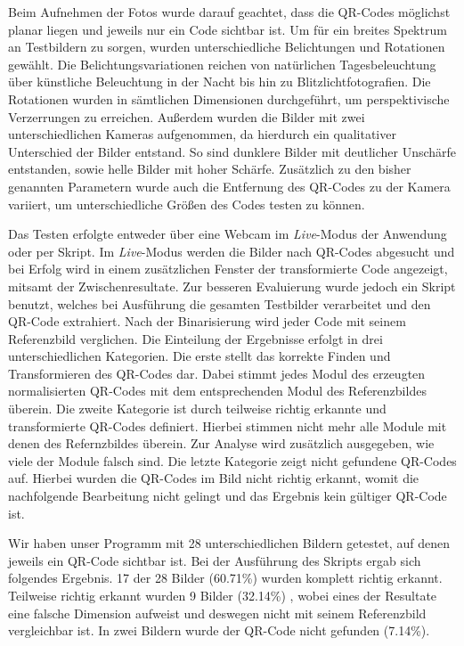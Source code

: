 \documentclass[a4paper, oneside, 12pt]{article}
\begin{document}
Beim Aufnehmen der Fotos wurde darauf geachtet, dass die QR-Codes möglichst planar liegen und jeweils nur ein Code sichtbar ist. Um für ein breites Spektrum an Testbildern zu sorgen, wurden unterschiedliche Belichtungen und Rotationen gewählt. Die Belichtungsvariationen reichen von natürlichen Tagesbeleuchtung über künstliche Beleuchtung in der Nacht bis hin zu Blitzlichtfotografien. Die Rotationen wurden in sämtlichen Dimensionen durchgeführt, um perspektivische Verzerrungen zu erreichen. Außerdem wurden die Bilder mit zwei unterschiedlichen Kameras aufgenommen, da hierdurch ein qualitativer Unterschied der Bilder entstand. So sind dunklere Bilder mit deutlicher Unschärfe entstanden, sowie helle Bilder mit hoher Schärfe. Zusätzlich zu den bisher genannten Parametern wurde auch die Entfernung des QR-Codes zu der Kamera variiert, um unterschiedliche Größen des Codes testen zu können.

Das Testen erfolgte entweder über eine Webcam im \emph{Live}-Modus der Anwendung oder per Skript. Im \emph{Live}-Modus werden die Bilder nach QR-Codes abgesucht und bei Erfolg wird in einem zusätzlichen Fenster der transformierte Code angezeigt, mitsamt der Zwischenresultate. Zur besseren Evaluierung wurde jedoch ein Skript benutzt, welches bei Ausführung die gesamten Testbilder verarbeitet und den QR-Code extrahiert. Nach der Binarisierung wird jeder Code mit seinem Referenzbild verglichen. Die Einteilung der Ergebnisse erfolgt in drei unterschiedlichen Kategorien. Die erste stellt das korrekte Finden und Transformieren des QR-Codes dar. Dabei stimmt jedes Modul des erzeugten normalisierten QR-Codes mit dem entsprechenden Modul des Referenzbildes überein. Die zweite Kategorie ist durch teilweise richtig erkannte und transformierte QR-Codes definiert. Hierbei stimmen nicht mehr alle Module mit denen des Refernzbildes überein. Zur Analyse wird zusätzlich ausgegeben, wie viele der Module falsch sind. Die letzte Kategorie zeigt nicht gefundene QR-Codes auf. Hierbei wurden die QR-Codes im Bild nicht richtig erkannt, womit die nachfolgende Bearbeitung nicht gelingt und das Ergebnis kein gültiger QR-Code ist. 

Wir haben unser Programm mit 28 unterschiedlichen Bildern getestet, auf denen jeweils ein QR-Code sichtbar ist. Bei der Ausführung des Skripts ergab sich folgendes Ergebnis. 17 der 28 Bilder (60.71\%) wurden komplett richtig erkannt. Teilweise richtig erkannt wurden 9 Bilder (32.14\%) , wobei eines der Resultate eine falsche Dimension aufweist und deswegen nicht mit seinem Referenzbild vergleichbar ist. In zwei Bildern wurde der QR-Code nicht gefunden (7.14\%).
\end{document}

